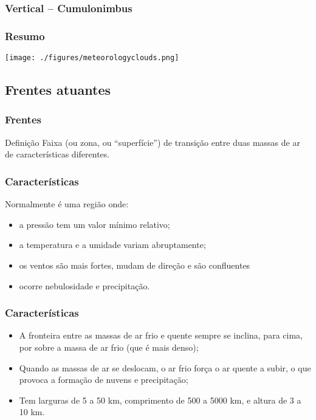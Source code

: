 \begin{frame}
\frametitle{Vertical -- Cumulonimbus}
  \begin{center}
  \end{center}
\end{frame}

\begin{frame}
\frametitle{Resumo}
  \begin{center}
    \texttt{[image: ./figures/meteorologyclouds.png]}
  \end{center}
\end{frame}

\subsection{Frentes atuantes}


\begin{frame}
\frametitle{Frentes}
\begin{block}{Definição}
  Faixa (ou zona, ou ``superfície'') de transição entre duas massas de ar de
  características diferentes.
\end{block}
\end{frame}


\begin{frame}
\frametitle{Características}
Normalmente é uma região onde:
  \begin{itemize}[<+-| alert@+>]
  \item a pressão tem um valor mínimo relativo;
  \item a temperatura e a umidade variam abruptamente;
  \item os ventos são mais fortes, mudam de direção e são confluentes
  \item ocorre nebulosidade e precipitação.
 \end{itemize}
\end{frame}


\begin{frame}
\frametitle{Características}
  \begin{itemize}[<+-| alert@+>]
  \item A fronteira entre as massas de ar frio e quente sempre se inclina,
        para cima, por sobre a massa de ar frio (que é mais denso);
  \item Quando as massas de ar se deslocam, o ar frio força o ar quente a
        subir, o que provoca a formação de nuvens e precipitação;
  \item Tem larguras de 5 a 50 km, comprimento de 500 a 5000 km, e altura de
        3 a 10 km.
  \end{itemize}
\end{frame}


